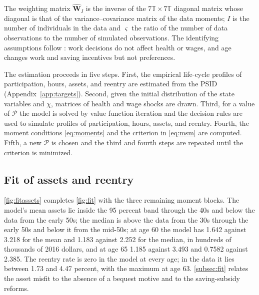 The weighting matrix $\hat{\mathbf{W}}_I$ is the inverse of the $7\mathbb{T}\times 7\mathbb{T}$ diagonal matrix whose diagonal is that of the variance--covariance matrix of the data moments; $I$ is the number of individuals in the data and $\varsigma$ the ratio of the number of data observations to the number of simulated observations. %
The identifying assumptions follow \citet{french2005effects}: work decisions do not affect health or wages, and age changes work and saving incentives but not preferences. %

The estimation proceeds in five steps. %
First, the empirical life-cycle profiles of participation, hours, assets, and reentry are estimated from the PSID (Appendix~\ref{app:targets}). Second, given the initial distribution of the state variables and $\chi$, matrices of health and wage shocks are drawn. Third, for a value of $\mathcal{P}$ the model is solved by value function iteration and the decision rules are used to simulate profiles of participation, hours, assets, and reentry. Fourth, the moment conditions \eqref{eq:moments} and the criterion in \eqref{eq:msm} are computed. Fifth, a new $\mathcal{P}$ is chosen and the third and fourth steps are repeated until the criterion is minimized. %

\subsection{Fit of assets and reentry}\label{app:fitassets}

\autoref{fig:fitassets} completes \autoref{fig:fit} with the three remaining moment blocks. %
The model's mean assets lie inside the 95 percent band through the 40s and below the data from the early 50s; the median is above the data from the 30s through the early 50s and below it from the mid-50s; at age 60 the model has 1.642 against 3.218 for the mean and 1.183 against 2.252 for the median, in hundreds of thousands of 2016 dollars, and at age 65 1.185 against 3.493 and 0.7582 against 2.385. %
The reentry rate is zero in the model at every age; in the data it lies between 1.73 and 4.47 percent, with the maximum at age 63. %
\autoref{subsec:fit} relates the asset misfit to the absence of a bequest motive and to the saving-subsidy reforms.

